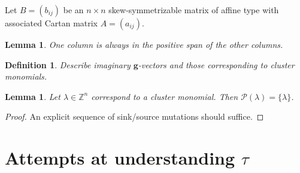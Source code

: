 \documentclass{amsart}
\newtheorem{definition}[theorem]{Definition}
\newtheorem{lemma}[theorem]{Lemma}
\numberwithin{theorem}{section}
\newcommand{\bfg}{\boldsymbol{g}}
\newcommand{\cP}{\mathcal{P}}
\newcommand{\ZZ}{\mathbb{Z}}
\begin{document}
  Let $B=(b_{ij})$ be an $n\times n$ skew-symmetrizable matrix of affine type with associated Cartan matrix $A=(a_{ij})$.
  
  \begin{lemma}
    One column is always in the positive span of the other columns.
  \end{lemma}

  \begin{definition}
    Describe imaginary $\bfg$-vectors and those corresponding to cluster monomials.
  \end{definition}

  \begin{lemma}
    Let $\lambda\in\ZZ^n$ correspond to a cluster monomial.
    Then $\cP(\lambda)=\{\lambda\}$.
  \end{lemma}
  \begin{proof}
    An explicit sequence of sink/source mutations should suffice.
  \end{proof}

  \section{Attempts at understanding $\tau$}
\end{document}
